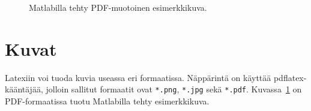 \begin{figure}[t]
\begin{center}
\end{center}
\caption{Matlabilla tehty PDF-muotoinen esimerkkikuva.}
\label{fig:esimKuva}
\end{figure}

\section{Kuvat}

Latexiin voi tuoda kuvia useassa eri formaatissa.
Näppärintä on käyttää pdflatex-kääntäjää, jolloin
sallitut formaatit ovat \verb+*.png+, \verb+*.jpg+
sekä \verb+*.pdf+. Kuvassa~\ref{fig:esimKuva} on
PDF-formaatissa tuotu Matlabilla tehty
esimerkkikuva.
